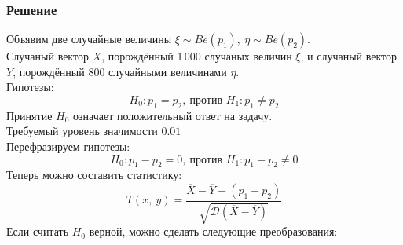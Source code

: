 \documentclass[12pt, a4paper]{article}
\newcommand{\dev}{\mathcal{D}}
\begin{document}
\subsubsection*{Решение}
Объявим две случайные величины $\xi \sim Be(p_1),\ \eta \sim Be(p_2)$.\\
Случаный вектор $X$, порождённый 1\,000 случаных величин $\xi$, и случаный вектор $Y$, порождённый 800 случайными величинами $\eta$.\\
Гипотезы:
\[H_0: p_1 = p_2,\ \text{против } H_1: p_1 \neq p_2\]
Принятие $H_0$ означает положительный ответ на задачу.\\
Требуемый уровень значимости $0.01$\\
Перефразируем гипотезы:
\[H_0: p_1 - p_2 = 0,\ \text{против } H_1: p_1 - p_2 \neq 0\]
Теперь можно составить статистику:
\[T(x,\ y) = \frac{\overline{X} - \overline{Y} - (p_1 - p_2)}{\sqrt{\dev(\overline{X} - \overline{Y})}}\]
Если считать $H_0$ верной, можно сделать следующие преобразования:
\end{document}
